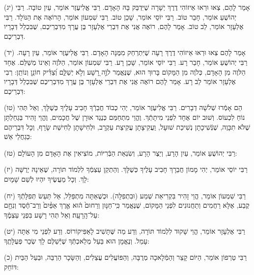 \documentclass[twoside, openany, parskip=half, 11pt]{book}
\begin{document}
(יג)
 אָמַר לָהֶם, צְאוּ וּרְאוּ אֵיזוֹהִי דֶרֶךְ יְשָׁרָה שֶׁיִּדְבַּק בָּהּ הָאָדָם.
רַבִּי אֱלִיעֶזֶר אוֹמֵר, עַיִן טוֹבָה.
רַבִּי יְהוֹשֻׁעַ אוֹמֵר, חָבֵר טוֹב.
רַבִּי יוֹסֵי אוֹמֵר, שָׁכֵן טוֹב.
רַבִּי שִׁמְעוֹן אוֹמֵר, הָרוֹאֶה אֶת הַנּוֹלָד.
רַבִּי אֶלְעָזָר אוֹמֵר, לֵב טוֹב.
אָמַר לָהֶם, רוֹאֶה אֲנִי אֶת דִּבְרֵי אֶלְעָזָר בֶּן עֲרָךְ מִדִּבְרֵיכֶם, שֶׁבִּכְלַל דְּבָרָיו דִּבְרֵיכֶם.

(יד)
אָמַר לָהֶם צְאוּ וּרְאוּ אֵיזוֹהִי דֶרֶךְ רָעָה שֶׁיִּתְרַחֵק מִמֶּנָּה הָאָדָם.
רַבִּי אֱלִיעֶזֶר אוֹמֵר, עַיִן רָעָה.
רַבִּי יְהוֹשֻׁעַ אוֹמֵר, חָבֵר רָע.
רַבִּי יוֹסֵי אוֹמֵר, שָׁכֵן רָע.
רַבִּי שִׁמְעוֹן אוֹמֵר, הַלֹּוֶה וְאֵינוֹ מְשַׁלֵּם. אֶחָד הַלֹּוֶה מִן הָאָדָם, כְּלֹוֶה מִן הַמָּקוֹם בָּרוּךְ הוּא, שֶׁנֶּאֱמַר לוֶֹ֣ה רָ֭שָׁע וְלֹ֣א יְשַׁלֵּ֑ם וְ֝צַדִּ֗יק חוֹנֵ֥ן וְנוֹתֵֽן: רְבִי אֶלְעָזָר אוֹמֵר לֵב רָע. אָמַר לָהֶם רוֹאֶה אֲנִי אֶת דִּבְרֵי אֶלְעָזָר בֶּן עֲרָךְ מִדִּבְרֵיכֶם שֶׁבִּכְלַל דְּבָרָיו דִּבְרֵיכֶם:

(טו)
 הֵם אָמְֿרוּ שְׁלשָׁה דְבָרִים. רַבִּי אֱלִיעֶזֶר אוֹמֵר, יְהִי כְבוֹד חֲבֵרְֿךָ חָבִיב עָלֶיךָ כְּשֶׁלָּךְ, וְאַל תְּהִי נוֹחַ לִכְעוֹס. וְשׁוּב יוֹם אֶחָד לִפְנֵי מִיתָתְֿךְ. וֶהֱוֵי מִתְחַמֵּם כְּנֶגֶד אוּרָן שֶׁל חֲכָמִים, וֶהֱוֵי זָהִיר בְּגַחַלְתָּן שֶׁלֹּא תִכָּוֶה, שֶׁנְּֿשִׁיכָתָן נְשִׁיכַת שׁוּעָל, וַעֲקִיצָתָן עֲקִיצַת עַקְרָב, וּלְחִישָׁתָן לְחִישַׁת שָׂרָף, וְכָל דִּבְרֵיהֶם כְּגַחֲלֵי אֵשׁ:

(טז)
 רַבִּי יְהוֹשֻׁעַ אוֹמֵר, עַיִן הָרָע, וְיֵצֶר הָרָע, וְשִׂנְאַת הַבְּֿרִיּוֹת, מוֹצִיאִין אֶת הָאָדָם מִן הָעוֹלָם:

(יז) רַבִּי יוֹסֵי אוֹמֵר, יְהִי מָמוֹן חֲבֵרָךְ חָבִיב עָלֶיךָ כְּשֶׁלָּךְ. וְהַתְקֵן עַצְמְֿךָ לִלְמוֹד תּוֹרָה, שֶׁאֵינָהּ יְרֻשָּׁה לָךְ. וְכָל מַעֲשֶׂיךָ יִהְיוּ לְשֵׁם שָׁמָיִם:

(יח)
 רַבִּי שִׁמְעוֹן אוֹמֵר, הֱוֵי זָהִיר בִּקְרִיאַת שְׁמַע (וּבִתְפִלָּה). וּכְשֶׁאַתָּה מִתְפַּלֵּל, אַל תַּעַשׂ תְּפִלָּתְֿךָ קֶבַע, אֶלָּא רַחֲמִים וְתַחֲנוּנִים לִפְנֵי הַמָּקוֹם, שֶׁנֶּאֱמַר כִּֽי־חַנּ֤וּן וְרַחוּם֙ ה֔וּא אֶ֤רֶךְ אַפַּ֨יִם֙ וְרַב־חֶ֔סֶד וְנִחָ֖ם עַל־הָֽרָעָֽה׃ וְאַל תְּהִי רָשָׁע בִּפְנֵי עַצְמֶֽֿךָ:

(יט)
 רַבִּי אֶלְעָזָר אוֹמֵר, הֱוֵי שָׁקוּד לִלְמוֹד תּוֹרָה, וְדַע מַה שֶּׁתָּשִׁיב לָאַפִּיקוֹרוֹס. וְדַע לִפְנֵי מִי אַתָּה עָמֵל. וְנֶאֱמָן הוּא בַּעַל מְלַאכְתְּֿךָ שֶׁיְּֿשַׁלֶּם לָךְ שְׂכַר פְּעֻלָּתֶֽךָ:


(כ)
 רַבִּי טַרְפוֹן אוֹמֵר, הַיּוֹם קָצֵר וְהַמְּֿלָאכָה מְרֻבָּה, וְהַפּוֹעֲלִים עֲצֵלִים, וְהַשָּׂכָר הַרְבֵּה, וּבַעַל הַבַּיִת דּוֹחֵק:
\end{document}
